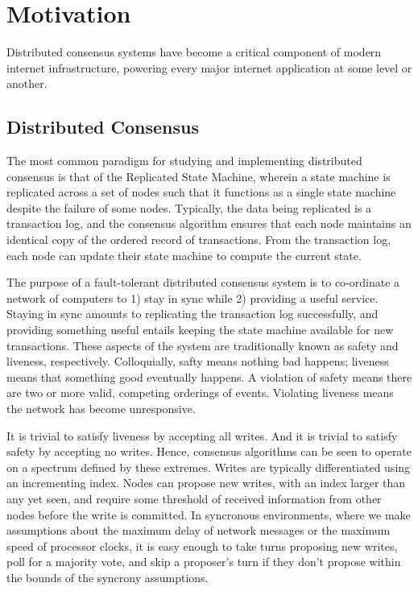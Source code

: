 \chapter{Motivation}

Distributed consensus systems have become a critical component of modern internet infrastructure, powering every major internet application at some level or another.

\section{Distributed Consensus}

The most common paradigm for studying and implementing distributed consensus is that of the Replicated State Machine, 
wherein a state machine is replicated across a set of nodes such that it functions as a single state machine despite the failure of some nodes.
Typically, the data being replicated is a transaction log, and the consensus algorithm ensures that each node maintains an identical copy of 
the ordered record of transactions.
From the transaction log, each node can update their state machine to compute the current state.

The purpose of a fault-tolerant distributed consensus system is to co-ordinate a network of computers to 1) stay in sync while 2) providing a useful service.
Staying in sync amounts to replicating the transaction log successfully, and providing something useful entails keeping the state machine available for new transactions.
These aspects of the system are traditionally known as safety and liveness, respectively.
Colloquially, safty means nothing bad happens; liveness means that something good eventually happens.
A violation of safety means there are two or more valid, competing orderings of events.
Violating liveness means the network has become unresponsive.

It is trivial to satisfy liveness by accepting all writes. And it is trivial to satisfy safety by accepting no writes.
Hence, consensus algorithms can be seen to operate on a spectrum defined by these extremes.
Writes are typically differentiated using an incrementing index.
Nodes can propose new writes, with an index larger than any yet seen,
and require some threshold of received information from other nodes before the write is committed.
In syncronous environments, where we make assumptions about the maximum delay of network messages or the maximum speed of processor clocks,
 it is easy enough to take turns proposing new writes, poll for a majority vote, 
and skip a proposer's turn if they don't propose within the bounds of the syncrony assumptions.

